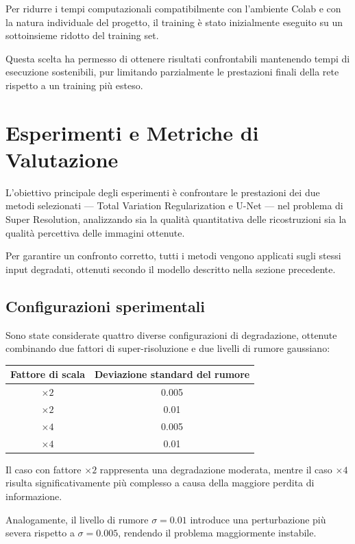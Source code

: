 \documentclass{article}
\begin{document}
Per ridurre i tempi computazionali compatibilmente con l’ambiente Colab e con la natura individuale del progetto, il training è stato inizialmente eseguito su un sottoinsieme ridotto del training set.

Questa scelta ha permesso di ottenere risultati confrontabili mantenendo tempi di esecuzione sostenibili, pur limitando parzialmente le prestazioni finali della rete rispetto a un training più esteso.

\newpage
\section{Esperimenti e Metriche di Valutazione}

L’obiettivo principale degli esperimenti è confrontare le prestazioni dei due metodi selezionati — Total Variation Regularization e U-Net — nel problema di Super Resolution, analizzando sia la qualità quantitativa delle ricostruzioni sia la qualità percettiva delle immagini ottenute.

Per garantire un confronto corretto, tutti i metodi vengono applicati sugli stessi input degradati, ottenuti secondo il modello descritto nella sezione precedente.

\subsection{Configurazioni sperimentali}

Sono state considerate quattro diverse configurazioni di degradazione, ottenute combinando due fattori di super-risoluzione e due livelli di rumore gaussiano:

\begin{center}
\begin{tabular}{cc}
\hline
Fattore di scala & Deviazione standard del rumore \\
\hline
$\times 2$ & 0.005 \\
$\times 2$ & 0.01 \\
$\times 4$ & 0.005 \\
$\times 4$ & 0.01 \\
\hline
\end{tabular}
\end{center}

Il caso con fattore \(\times 2\) rappresenta una degradazione moderata, mentre il caso \(\times 4\) risulta significativamente più complesso a causa della maggiore perdita di informazione.

Analogamente, il livello di rumore \(\sigma = 0.01\) introduce una perturbazione più severa rispetto a \(\sigma = 0.005\), rendendo il problema maggiormente instabile.
\end{document}
